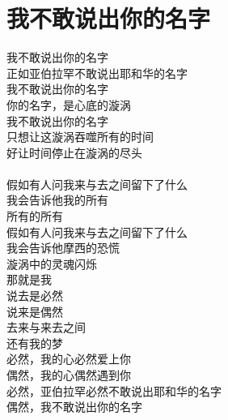 \chapter{我不敢说出你的名字}

\leftskip=25mm
\noindent
我不敢说出你的名字\\
正如亚伯拉罕不敢说出耶和华的名字\\

我不敢说出你的名字\\
你的名字，是心底的漩涡\\
我不敢说出你的名字\\
只想让这漩涡吞噬所有的时间\\
好让时间停止在漩涡的尽头\\
\\
假如有人问我来与去之间留下了什么\\
我会告诉他我的所有\\
所有的所有\\
假如有人问我来与去之间留下了什么\\
我会告诉他摩西的恐慌\\
漩涡中的灵魂闪烁\\
那就是我\\

说去是必然\\
说来是偶然\\
去来与来去之间\\
还有我的梦\\
必然，我的心必然爱上你\\
偶然，我的心偶然遇到你\\
必然，亚伯拉罕必然不敢说出耶和华的名字\\
偶然，我不敢说出你的名字

